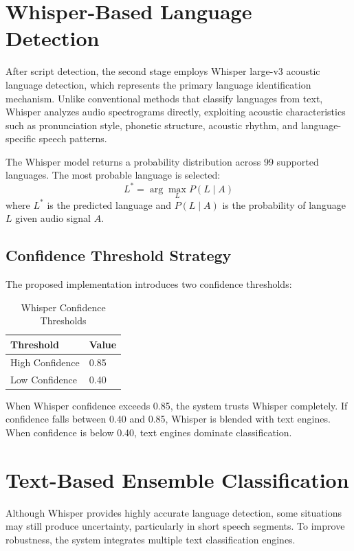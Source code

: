 \documentclass[12pt]{report}
\begin{document}
\section{Whisper-Based Language Detection}

After script detection, the second stage employs Whisper large-v3 acoustic language detection, which represents the primary language identification mechanism. Unlike conventional methods that classify languages from text, Whisper analyzes audio spectrograms directly, exploiting acoustic characteristics such as pronunciation style, phonetic structure, acoustic rhythm, and language-specific speech patterns.

The Whisper model returns a probability distribution across 99 supported languages. The most probable language is selected:
\[
L^* = \arg\max_L P(L \mid A)
\]
where $L^*$ is the predicted language and $P(L \mid A)$ is the probability of language $L$ given audio signal $A$.

\subsection{Confidence Threshold Strategy}

The proposed implementation introduces two confidence thresholds:

\begin{table}[H]
\centering
\begin{tabular}{|l|l|}
\hline
\textbf{Threshold} & \textbf{Value} \\
\hline
High Confidence & 0.85 \\
\hline
Low Confidence & 0.40 \\
\hline
\end{tabular}
\caption{Whisper Confidence Thresholds}
\end{table}

When Whisper confidence exceeds 0.85, the system trusts Whisper completely. If confidence falls between 0.40 and 0.85, Whisper is blended with text engines. When confidence is below 0.40, text engines dominate classification.

\section{Text-Based Ensemble Classification}

Although Whisper provides highly accurate language detection, some situations may still produce uncertainty, particularly in short speech segments. To improve robustness, the system integrates multiple text classification engines.
\end{document}
